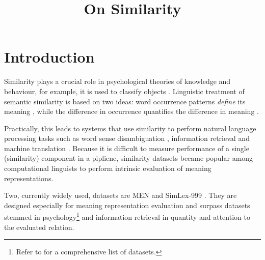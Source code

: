 \documentclass[11pt]{article}
\title{On Similarity}
\date{}
\begin{document}
\maketitle

\begin{abstract}

\end{abstract}

\section{Introduction}
\label{sec:introduction}

Similarity plays a crucial role in psychological theories of knowledge and behaviour, for example, it is used to classify objects \cite{Tversky1977}.
Linguistic treatment of semantic similarity is based on two ideas: word occurrence patterns \emph{define} its meaning \cite{firth1957lingtheory}, while the difference in occurrence \textup{quantifies} the difference in meaning \cite{harris1954distributional}.

Practically, this leads to systems that use similarity to perform natural language processing tasks such as word sense disambiguation \cite{Schutze:1998:AWS:972719.972724}, information retrieval \cite{Salton:1975:VSM:361219.361220} and machine translation \cite{Dagan:1993:CWS:981574.981596}. Because it is difficult to measure performance of a single (similarity) component in a pipliene, similarity datasets became popular among computational linguists to perform intrinsic evaluation of meaning representations.

Two, currently widely used, datasets are MEN \cite{Bruni:2012:DST:2390524.2390544} and SimLex-999 \cite{hill2014simlex}. They are designed especially for meaning representation evaluation and surpass datasets stemmed in psychology\footnote{Refer to  for a comprehensive list of datasets.} and information retrieval \cite{2002:PSC:503104.503110} in quantity and attention to the evaluated relation.
\end{document}
